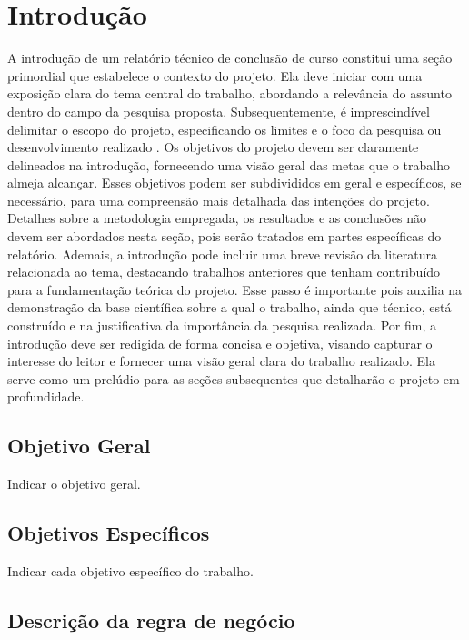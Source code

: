 \chapter{Introdução}

A introdução de um relatório técnico de conclusão de curso constitui uma seção primordial que estabelece o contexto do projeto. Ela deve iniciar com uma exposição clara do tema central do trabalho, abordando a relevância do assunto dentro do campo da pesquisa proposta. Subsequentemente, é imprescindível delimitar o escopo do projeto, especificando os limites e o foco da pesquisa ou desenvolvimento realizado \cite{abnTeX2009}.
Os objetivos do projeto devem ser claramente delineados na introdução, fornecendo uma visão geral das metas que o trabalho almeja alcançar. Esses objetivos podem ser subdivididos em geral e específicos, se necessário, para uma compreensão mais detalhada das intenções do projeto. Detalhes sobre a metodologia empregada, os resultados e as conclusões não devem ser abordados nesta seção, pois serão tratados em partes específicas do relatório.
Ademais, a introdução pode incluir uma breve revisão da literatura relacionada ao tema, destacando trabalhos anteriores que tenham contribuído para a fundamentação teórica do projeto. Esse passo é importante pois auxilia na demonstração da base científica sobre a qual o trabalho, ainda que técnico, está construído e na justificativa da importância da pesquisa realizada.
Por fim, a introdução deve ser redigida de forma concisa e objetiva, visando capturar o interesse do leitor e fornecer uma visão geral clara do trabalho realizado. Ela serve como um prelúdio para as seções subsequentes que detalharão o projeto em profundidade.


\section{Objetivo Geral}

Indicar o objetivo geral.

\section{Objetivos Específicos}

Indicar cada objetivo específico do trabalho.

\section{Descrição da regra de negócio}

